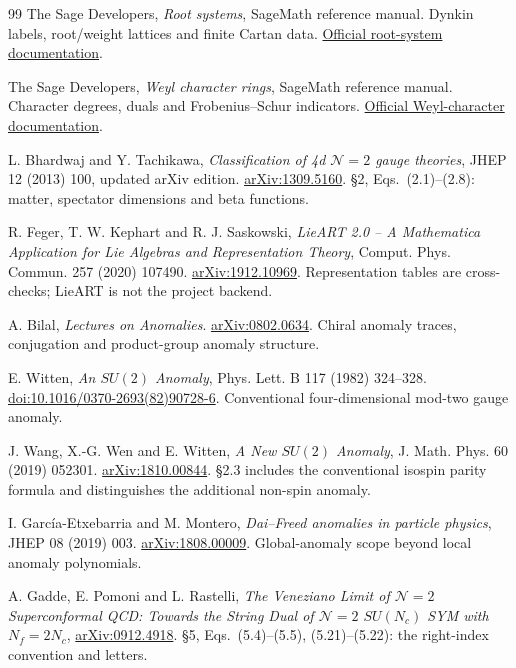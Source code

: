 \documentclass[11pt,a4paper]{article}
\numberwithin{equation}{section}
\begin{document}
\begin{thebibliography}{99}
\small\setlength{\itemsep}{8pt}
 The Sage Developers, \emph{Root systems}, SageMath reference
manual. Dynkin labels, root/weight lattices and finite Cartan data.
\href{https://doc.sagemath.org/html/en/reference/combinat/sage/combinat/root_system/root_system.html}{Official root-system documentation}.

 The Sage Developers, \emph{Weyl character rings}, SageMath
reference manual. Character degrees, duals and Frobenius--Schur indicators.
\href{https://doc.sagemath.org/html/en/reference/combinat/sage/combinat/root_system/weyl_characters.html}{Official Weyl-character documentation}.

 L. Bhardwaj and Y. Tachikawa, \emph{Classification of 4d
$\mathcal N=2$ gauge theories}, JHEP 12 (2013) 100, updated arXiv edition.
\href{https://arxiv.org/abs/1309.5160}{arXiv:1309.5160}.
\S2, Eqs.~(2.1)--(2.8): matter, spectator dimensions and beta functions.

 R. Feger, T. W. Kephart and R. J. Saskowski,
\emph{LieART 2.0 -- A Mathematica Application for Lie Algebras and Representation
Theory}, Comput. Phys. Commun. 257 (2020) 107490.
\href{https://arxiv.org/abs/1912.10969}{arXiv:1912.10969}.
Representation tables are cross-checks; LieART is not the project backend.

 A. Bilal, \emph{Lectures on Anomalies}.
\href{https://arxiv.org/abs/0802.0634}{arXiv:0802.0634}.
Chiral anomaly traces, conjugation and product-group anomaly structure.

 E. Witten, \emph{An $SU(2)$ Anomaly}, Phys. Lett. B 117
(1982) 324--328.
\href{https://doi.org/10.1016/0370-2693(82)90728-6}{doi:10.1016/0370-2693(82)90728-6}.
Conventional four-dimensional mod-two gauge anomaly.

 J. Wang, X.-G. Wen and E. Witten, \emph{A New $SU(2)$ Anomaly},
J. Math. Phys. 60 (2019) 052301.
\href{https://arxiv.org/abs/1810.00844}{arXiv:1810.00844}.
\S2.3 includes the conventional isospin parity formula and distinguishes the
additional non-spin anomaly.

 I. Garc\'ia-Etxebarria and M. Montero,
\emph{Dai--Freed anomalies in particle physics}, JHEP 08 (2019) 003.
\href{https://arxiv.org/abs/1808.00009}{arXiv:1808.00009}.
Global-anomaly scope beyond local anomaly polynomials.

 A. Gadde, E. Pomoni and L. Rastelli,
\emph{The Veneziano Limit of $\mathcal N=2$ Superconformal QCD: Towards the
String Dual of $\mathcal N=2$ $SU(N_c)$ SYM with $N_f=2N_c$},
\href{https://arxiv.org/abs/0912.4918}{arXiv:0912.4918}.
\S5, Eqs.~(5.4)--(5.5), (5.21)--(5.22): the right-index convention and letters.


\end{thebibliography}
\end{document}
